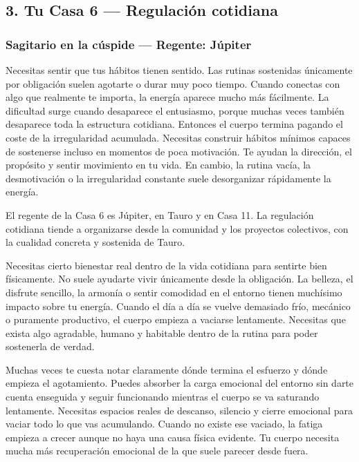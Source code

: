 \documentclass[11pt,a4paper]{article}
\begin{document}
\vspace{0.8cm}

\subsection{3. Tu Casa 6 — Regulación cotidiana}

\subsubsection*{Sagitario en la cúspide — Regente: Júpiter}

Necesitas sentir que tus hábitos tienen sentido. Las rutinas sostenidas únicamente por obligación suelen agotarte o durar muy poco tiempo. Cuando conectas con algo que realmente te importa, la energía aparece mucho más fácilmente. La dificultad surge cuando desaparece el entusiasmo, porque muchas veces también desaparece toda la estructura cotidiana. Entonces el cuerpo termina pagando el coste de la irregularidad acumulada. Necesitas construir hábitos mínimos capaces de sostenerse incluso en momentos de poca motivación. Te ayudan la dirección, el propósito y sentir movimiento en tu vida. En cambio, la rutina vacía, la desmotivación o la irregularidad constante suele desorganizar rápidamente la energía.

El regente de la Casa 6 es Júpiter, en Tauro y en Casa 11. La regulación cotidiana tiende a organizarse desde la comunidad y los proyectos colectivos, con la cualidad concreta y sostenida de Tauro.

Necesitas cierto bienestar real dentro de la vida cotidiana para sentirte bien físicamente. No suele ayudarte vivir únicamente desde la obligación. La belleza, el disfrute sencillo, la armonía o sentir comodidad en el entorno tienen muchísimo impacto sobre tu energía. Cuando el día a día se vuelve demasiado frío, mecánico o puramente productivo, el cuerpo empieza a vaciarse lentamente. Necesitas que exista algo agradable, humano y habitable dentro de la rutina para poder sostenerla de verdad.

Muchas veces te cuesta notar claramente dónde termina el esfuerzo y dónde empieza el agotamiento. Puedes absorber la carga emocional del entorno sin darte cuenta enseguida y seguir funcionando mientras el cuerpo se va saturando lentamente. Necesitas espacios reales de descanso, silencio y cierre emocional para vaciar todo lo que vas acumulando. Cuando no existe ese vaciado, la fatiga empieza a crecer aunque no haya una causa física evidente. Tu cuerpo necesita mucha más recuperación emocional de la que suele parecer desde fuera.
\end{document}
